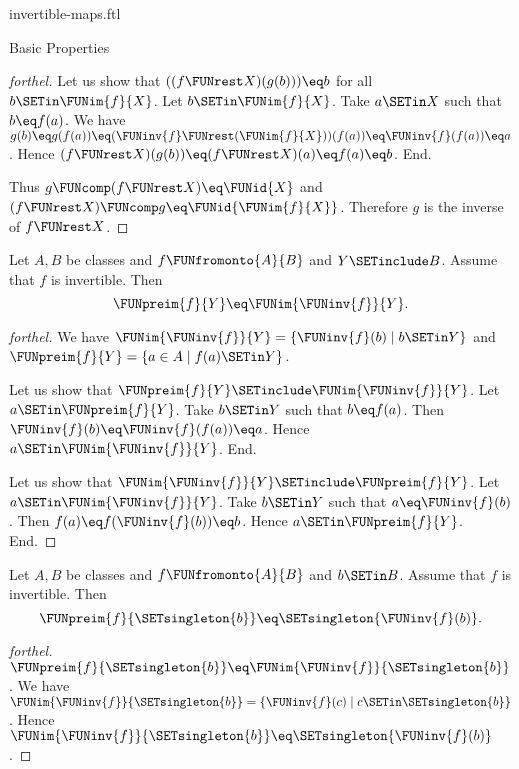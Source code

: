 \documentclass{stex}
\begin{document}
\begin{smodule}{invertible-maps.ftl}
\begin{sfragment}{Basic Properties}
\begin{proof}[forthel]
    Let us show that $((f \FUNrest X)(g(b))) \eq b$ for all $b \SETin \FUNim{f}{X}$.
      Let $b \SETin \FUNim{f}{X}$.
      Take $a \SETin X$ such that $b \eq f(a)$.
      We have $g(b)
        \eq g(f(a))
        \eq (\FUNinv{f} \FUNrest (\FUNim{f}{X}))(f(a))
        \eq \FUNinv{f}(f(a))
        \eq a$.
      Hence $(f \FUNrest X)(g(b))
        \eq (f \FUNrest X)(a)
        \eq f(a)
        \eq b$.
    End.

    Thus $g \FUNcomp (f \FUNrest X) \eq \FUNid{X}$ and $(f \FUNrest X) \FUNcomp g \eq \FUNid{\FUNim{f}{X}}$.
    Therefore $g$ is the inverse of $f \FUNrest X$.
  \end{proof}

  \begin{proposition}[forthel,id=FOUNDATIONS_09_7726021377785856]
    Let $A, B$ be classes and $f \FUNfromonto{A}{B}$ and $Y \SETinclude B$.
    Assume that $f$ is invertible.
    Then \[ \FUNpreim{f}{Y} \eq \FUNim{\FUNinv{f}}{Y}. \]
  \end{proposition}
  \begin{proof}[forthel]
    We have $\FUNim{\FUNinv{f}}{Y} = \{ \FUNinv{f}(b) \mid b \SETin Y \}$ and $\FUNpreim{f}{Y} = \{ a \in A \mid f(a) \SETin Y \}$.

    Let us show that $\FUNpreim{f}{Y} \SETinclude \FUNim{\FUNinv{f}}{Y}$.
      Let $a \SETin \FUNpreim{f}{Y}$.
      Take $b \SETin Y$ such that $b \eq f(a)$.
      Then $\FUNinv{f}(b) \eq \FUNinv{f}(f(a)) \eq a$.
      Hence $a \SETin \FUNim{\FUNinv{f}}{Y}$.
    End.

    Let us show that $\FUNim{\FUNinv{f}}{Y} \SETinclude \FUNpreim{f}{Y}$.
      Let $a \SETin \FUNim{\FUNinv{f}}{Y}$.
      Take $b \SETin Y$ such that $a \eq \FUNinv{f}(b)$.
      Then $f(a) \eq f(\FUNinv{f}(b)) \eq b$.
      Hence $a \SETin \FUNpreim{f}{Y}$.
    End.
  \end{proof}

  \begin{corollary}[forthel,id=FOUNDATIONS_09_8607784268464128]
    Let $A, B$ be classes and $f \FUNfromonto{A}{B}$ and $b \SETin B$.
    Assume that $f$ is invertible.
    Then \[ \FUNpreim{f}{\SETsingleton{b}} \eq \SETsingleton{\FUNinv{f}(b)}. \]
  \end{corollary}
  \begin{proof}[forthel]
    $\FUNpreim{f}{\SETsingleton{b}} \eq \FUNim{\FUNinv{f}}{\SETsingleton{b}}$.
    We have $\FUNim{\FUNinv{f}}{\SETsingleton{b}} = \{ \FUNinv{f}(c) \mid c \SETin \SETsingleton{b} \}$.
    Hence $\FUNim{\FUNinv{f}}{\SETsingleton{b}} \eq \SETsingleton{\FUNinv{f}(b)}$.
  \end{proof}


\end{sfragment}
\end{smodule}
\end{document}

